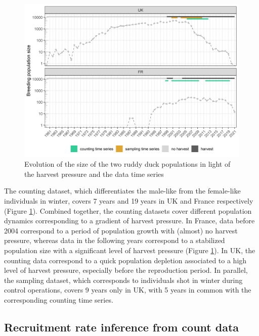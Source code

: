 \documentclass[
  english,
]{article}
\begin{document}
\begin{figure}[H]

{\centering \includegraphics[width=1\linewidth]{../Output/plot_2} 

}

\caption{Evolution of the size of the two ruddy duck populations in light of the harvest pressure and the data time series}\label{fig:count}
\end{figure}

The counting dataset, which differentiates the male-like from the female-like individuals in winter, covers 7 years and 19 years in UK and France respectively (Figure \ref{fig:count}). Combined together, the counting datasets cover different population dynamics corresponding to a gradient of harvest pressure. In France, data before 2004 correspond to a period of population growth with (almost) no harvest pressure, whereas data in the following years correspond to a stabilized population size with a significant level of harvest pressure (Figure \ref{fig:count}). In UK, the counting data correspond to a quick population depletion associated to a high level of harvest pressure, especially before the reproduction period. In parallel, the sampling dataset, which corresponds to individuals shot in winter during control operations, covers 9 years only in UK, with 5 years in common with the corresponding counting time series.

\hypertarget{recruitment-rate-inference-from-count-data}{%
\subsection{Recruitment rate inference from count data}\label{recruitment-rate-inference-from-count-data}}
\end{document}
